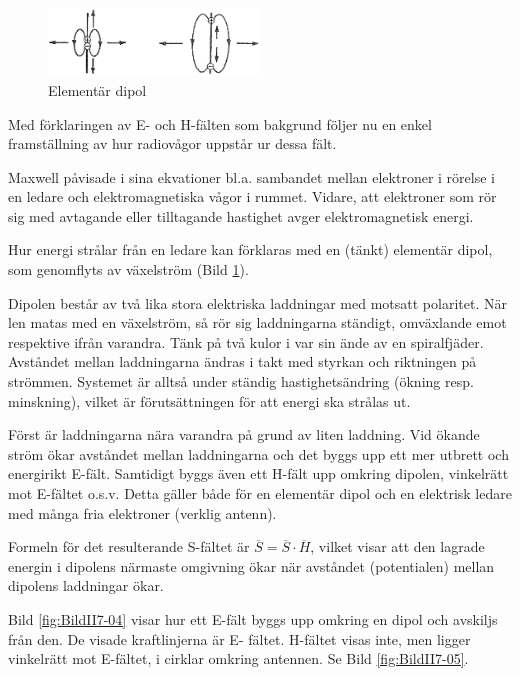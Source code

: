 \begin{figure}
\includegraphics[width=0.5\textwidth]{images/cropped_pdfs/bild_2_7-03.pdf}
\caption{Elementär dipol}
\label{fig:BildII7-03}
\end{figure}

Med förklaringen av E- och H-fälten som bakgrund följer nu en enkel
framställning av hur radiovågor uppstår ur dessa fält.

Maxwell påvisade i sina ekvationer bl.a. sambandet mellan elektroner
i rörelse i en ledare och elektromagnetiska vågor i rummet. Vidare,
att elektroner som rör sig med avtagande eller tilltagande hastighet
avger elektromagnetisk energi.

Hur energi strålar från en ledare kan förklaras med en (tänkt)
elementär dipol, som genomflyts av växelström (Bild \ref{fig:BildII7-03}).

Dipolen består av två lika stora elektriska laddningar med motsatt
polaritet. När len matas med en växelström, så rör sig laddningarna
ständigt, omväxlande emot respektive ifrån varandra. Tänk på två kulor
i var sin ände av en spiralfjäder. Avståndet mellan laddningarna
ändras i takt med styrkan och riktningen på strömmen. Systemet är
alltså under ständig hastighetsändring (ökning resp. minskning),
vilket är förutsättningen för att energi ska strålas ut.

Först är laddningarna nära varandra på grund av liten laddning. Vid
ökande ström ökar avståndet mellan laddningarna och det byggs upp ett
mer utbrett och energirikt E-fält. Samtidigt byggs även ett H-fält upp
omkring dipolen, vinkelrätt mot E-fältet o.s.v. Detta gäller både för
en elementär dipol och en elektrisk ledare med många fria elektroner
(verklig antenn).

Formeln för det resulterande S-fältet är \(\overline{S} =
\overline{S}\cdot\overline{H}\), vilket visar att den lagrade energin
i dipolens närmaste omgivning ökar när avståndet (potentialen) mellan
dipolens laddningar ökar.

Bild \ref{fig:BildII7-04} visar hur ett E-fält byggs upp omkring en dipol och
avskiljs från den. De visade kraftlinjerna är E- fältet. H-fältet
visas inte, men ligger vinkelrätt mot E-fältet, i cirklar omkring
antennen. Se Bild \ref{fig:BildII7-05}.

